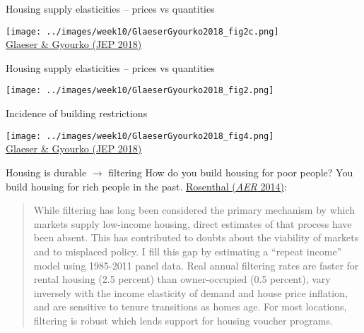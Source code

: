 \documentclass[11pt,notes=hide,aspectratio=169]{beamer}
\begin{document}
\begin{frame}{Housing supply elasticities -- prices vs quantities}
\begin{center}
\texttt{[image: ../images/week10/GlaeserGyourko2018\_fig2c.png]}\\
\href{https://www.aeaweb.org/articles?id=10.1257/jep.32.1.3}{Glaeser \& Gyourko (JEP 2018)}\end{center}
\end{frame}
\begin{frame}{Housing supply elasticities -- prices vs quantities}
\begin{center}
\texttt{[image: ../images/week10/GlaeserGyourko2018\_fig2.png]}
\end{center}
\end{frame}
\begin{frame}{Incidence of building restrictions}
\begin{center}
\texttt{[image: ../images/week10/GlaeserGyourko2018\_fig4.png]}\\
\href{https://www.aeaweb.org/articles?id=10.1257/jep.32.1.3}{Glaeser \& Gyourko (JEP 2018)}
\end{center}
\end{frame}
\begin{frame}{Housing is durable $\to$ filtering}
How do you build housing for poor people? You build housing for rich people in the past.
\href{https://www.aeaweb.org/articles?id=10.1257/aer.104.2.687}{Rosenthal (\textit{AER} 2014)}:
\begin{quote}{
	While filtering has long been considered the primary mechanism by which markets supply low-income housing, direct estimates of that process have been absent.
	This has contributed to doubts about the viability of markets and to misplaced policy.
	I fill this gap by estimating a ``repeat income'' model using 1985-2011 panel data.
	Real annual filtering rates are faster for rental housing (2.5 percent) than owner-occupied (0.5 percent), vary inversely with the income elasticity of demand and house price inflation, and are sensitive to tenure transitions as homes age.
	For most locations, filtering is robust which lends support for housing voucher programs.
}\end{quote}
\end{frame}
\end{document}
